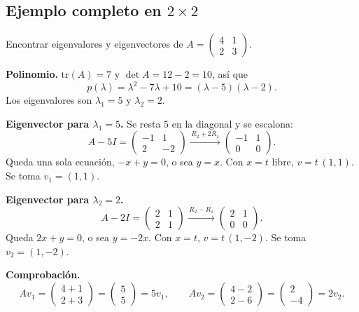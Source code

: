 \documentclass[11pt,letterpaper]{article}
\begin{document}

\subsection*{Ejemplo completo en $2 \times 2$}

\begin{ejemplo}
    Encontrar eigenvalores y eigenvectores de
    $A = \begin{pmatrix} 4 & 1 \\ 2 & 3 \end{pmatrix}$.

    \textbf{Polinomio.} $\mathrm{tr}(A) = 7$ y
    $\det A = 12 - 2 = 10$, así que
    \[
        p(\lambda) = \lambda^2 - 7\lambda + 10
                   = (\lambda - 5)(\lambda - 2) .
    \]
    Los eigenvalores son $\lambda_1 = 5$ y $\lambda_2 = 2$.

    \textbf{Eigenvector para $\lambda_1 = 5$.} Se resta $5$ en la
    diagonal y se escalona:
    \[
        A - 5I = \begin{pmatrix} -1 & 1 \\ 2 & -2 \end{pmatrix}
        \xrightarrow{\,R_2 + 2R_1\,}
        \begin{pmatrix} -1 & 1 \\ 0 & 0 \end{pmatrix} .
    \]
    Queda una sola ecuación, $-x + y = 0$, o sea $y = x$. Con $x = t$
    libre, $v = t\,(1, 1)$. Se toma $v_1 = (1, 1)$.

    \textbf{Eigenvector para $\lambda_2 = 2$.}
    \[
        A - 2I = \begin{pmatrix} 2 & 1 \\ 2 & 1 \end{pmatrix}
        \xrightarrow{\,R_2 - R_1\,}
        \begin{pmatrix} 2 & 1 \\ 0 & 0 \end{pmatrix} .
    \]
    Queda $2x + y = 0$, o sea $y = -2x$. Con $x = t$,
    $v = t\,(1, -2)$. Se toma $v_2 = (1, -2)$.

    \textbf{Comprobación.}
    \[
        A v_1 = \begin{pmatrix} 4 + 1 \\ 2 + 3 \end{pmatrix}
              = \begin{pmatrix} 5 \\ 5 \end{pmatrix} = 5 v_1 ,
        \qquad
        A v_2 = \begin{pmatrix} 4 - 2 \\ 2 - 6 \end{pmatrix}
              = \begin{pmatrix} 2 \\ -4 \end{pmatrix} = 2 v_2 .
    \]
\end{ejemplo}
\end{document}
